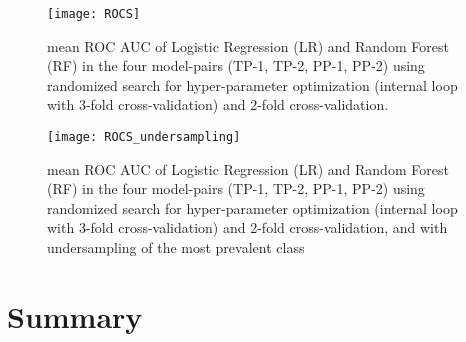 \begin{figure}[H]
    \hspace*{-1.0cm}
    \centering
    \texttt{[image: ROCS]}
    \caption{mean ROC AUC of Logistic Regression (LR) and Random Forest (RF) in the four model-pairs (TP-1, TP-2, PP-1, PP-2) using randomized search for hyper-parameter optimization (internal loop with 3-fold cross-validation) and 2-fold cross-validation. }
    \label{fig:rocs}
\end{figure}
\begin{figure}[H]
    \hspace*{-1.0cm}
    \centering
    \texttt{[image: ROCS\_undersampling]}
    \caption{mean ROC AUC of Logistic Regression (LR) and Random Forest (RF) in the four model-pairs (TP-1, TP-2, PP-1, PP-2) using randomized search for hyper-parameter optimization (internal loop with 3-fold cross-validation) and 2-fold cross-validation, and with undersampling of the most prevalent class}
    \label{fig:rocs_undersampling}
\end{figure}
\section{Summary}